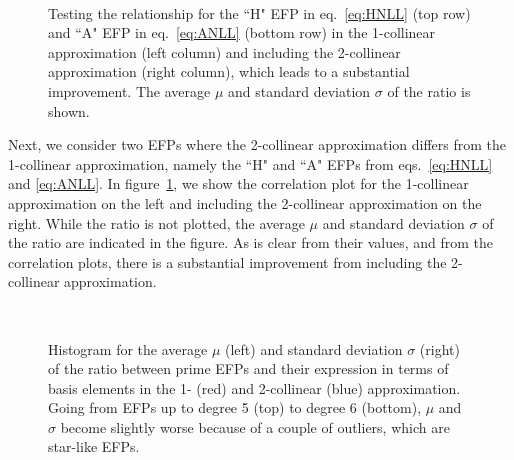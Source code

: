 \documentclass[a4paper,11pt]{article}
\newcommand{\eq}[1]{eq.~\eqref{eq:#1}}
\newcommand{\eqs}[2]{eqs.~\eqref{eq:#1} and \eqref{eq:#2}}
\newcommand{\fig}[1]{figure~\ref{fig:#1}}
\begin{document}
   \begin{figure}[p]
     \hfill 
     \\ 
      \hfill
      \caption{Testing the relationship for the ``H" EFP in \eq{HNLL} (top row) and ``A" EFP in \eq{ANLL} (bottom row) in the 1-collinear approximation (left column) and including the 2-collinear approximation (right column), which leads to a substantial improvement. The average $\mu$ and standard deviation $\sigma$ of the ratio is shown. \label{fig:corr2}}
     \end{figure}
     
Next, we consider two EFPs where the 2-collinear approximation differs from the 1-collinear approximation, namely the ``H" and ``A" EFPs from \eqs{HNLL}{ANLL}.
%
In \fig{corr2}, we show the correlation plot for the 1-collinear approximation on the left and including the 2-collinear approximation on the right.
%
While the ratio is not plotted, the average $\mu$ and standard deviation $\sigma$ of the ratio are indicated in the figure.
%
As is clear from their values, and from the correlation plots, there is a substantial improvement from including the 2-collinear approximation.
    
   \begin{figure}[p]
     \hfill 
      \\ 
    \hfill
    \hfill 
\caption{Histogram for the average $\mu$ (left) and standard deviation $\sigma$ (right) of the ratio between prime EFPs and their expression in terms of basis elements in the 1- (red) and 2-collinear (blue) approximation. Going from EFPs up to degree 5 (top) to degree 6 (bottom), $\mu$ and $\sigma$ become slightly worse because of a couple of outliers, which are star-like EFPs. \label{fig:corr_histogram}}
     \end{figure}
     
\end{document}
